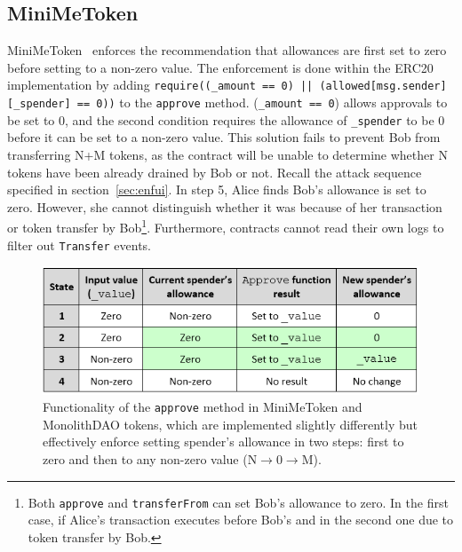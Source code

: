 
\subsection{MiniMeToken}\label{sec:MiniMeToken}

MiniMeToken~\cite{Ref15} enforces the recommendation that allowances are first set to zero before setting to a non-zero value. The enforcement is done within the ERC20 implementation by adding \texttt{require((\_amount == 0) || (allowed[msg.sender][\_spender] == 0))} to the \texttt{approve} method. (\texttt{\_amount == 0}) allows approvals to be set to 0, and the second condition requires the allowance of \texttt{\_spender} to be 0 before it can be set to a non-zero value. This solution fails to prevent Bob from transferring N+M tokens, as the contract will be unable to determine whether N tokens have been already drained by Bob or not. Recall the attack sequence specified in section~\ref{sec:enfui}. In step 5, Alice finds Bob's allowance is set to zero. However, she cannot distinguish whether it was because of her transaction or token transfer by Bob\footnote{Both \texttt{approve} and \texttt{transferFrom} can set Bob's allowance to zero. In the first case, if Alice's transaction executes before Bob's and in the second one due to token transfer by Bob.}. Furthermore, contracts cannot read their own logs to filter out \texttt{Transfer} events.



\begin{figure}[t]
	\centering
	\includegraphics[width=1.0\linewidth]{figures/multiple_withdrawal_09.png}
	\caption{Functionality of the \texttt{approve} method in MiniMeToken and MonolithDAO tokens, which are implemented slightly differently but effectively enforce setting spender's allowance in two steps: first to zero and then to any non-zero value (\eg N$\rightarrow$0$\rightarrow$M).\label{fig:dao}}
\end{figure}

